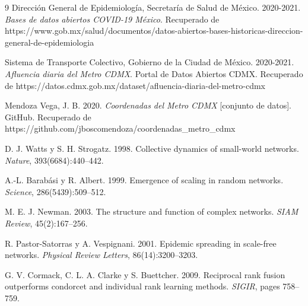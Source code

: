 \documentclass[10pt,twocolumn]{article}
\begin{document}

\begin{thebibliography}{9}
Dirección General de Epidemiología, Secretaría de Salud de México. 2020-2021. \textit{Bases de datos abiertos COVID-19 México}. Recuperado de https://www.gob.mx/salud/documentos/datos-abiertos-bases-historicas-direccion-general-de-epidemiologia

Sistema de Transporte Colectivo, Gobierno de la Ciudad de México. 2020-2021. \textit{Afluencia diaria del Metro CDMX}. Portal de Datos Abiertos CDMX. Recuperado de https://datos.cdmx.gob.mx/dataset/afluencia-diaria-del-metro-cdmx

Mendoza Vega, J. B. 2020. \textit{Coordenadas del Metro CDMX} [conjunto de datos]. GitHub. Recuperado de https://github.com/jboscomendoza/coordenadas\_metro\_cdmx

D. J. Watts y S. H. Strogatz. 1998. Collective dynamics of small-world networks. \textit{Nature}, 393(6684):440--442.

A.-L. Barabási y R. Albert. 1999. Emergence of scaling in random networks. \textit{Science}, 286(5439):509--512.

M. E. J. Newman. 2003. The structure and function of complex networks. \textit{SIAM Review}, 45(2):167--256.

R. Pastor-Satorras y A. Vespignani. 2001. Epidemic spreading in scale-free networks. \textit{Physical Review Letters}, 86(14):3200--3203.

G. V. Cormack, C. L. A. Clarke y S. Buettcher. 2009. Reciprocal rank fusion outperforms condorcet and individual rank learning methods. \textit{SIGIR}, pages 758--759.
\end{thebibliography}
\end{document}

